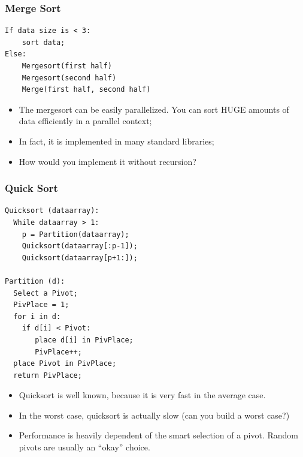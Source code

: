 \documentclass{beamer}
\begin{document}
\begin{frame}
  \frametitle{Merge Sort}
  \begin{block}{}
{\smaller
\begin{verbatim}
If data size is < 3:
    sort data;
Else:
    Mergesort(first half)
    Mergesort(second half)
    Merge(first half, second half)
\end{verbatim}
}
  \end{block}
  \begin{itemize}
  \item The mergesort can be easily parallelized. You can sort HUGE
    amounts of data efficiently in a parallel context;
  \item In fact, it is implemented in many standard libraries;
  \item How would you implement it without recursion?
  \end{itemize}
\end{frame}

\begin{frame}
  \frametitle{Quick Sort}
  
  \begin{block}{}
{\tiny
\begin{verbatim}
Quicksort (dataarray):
  While dataarray > 1:
    p = Partition(dataarray);
    Quicksort(dataarray[:p-1]);
    Quicksort(dataarray[p+1:]);

Partition (d):
  Select a Pivot;
  PivPlace = 1;
  for i in d:
    if d[i] < Pivot:
       place d[i] in PivPlace;
       PivPlace++;
  place Pivot in PivPlace;
  return PivPlace;
\end{verbatim}
}
\end{block}

  \begin{itemize}
  \item Quicksort is well known, because it is very fast in the average case.
  \item In the worst case, quicksort is actually slow (can you build a worst case?)
  \item Performance is heavily dependent of the smart selection of a
    pivot. Random pivots are usually an ``okay'' choice.
  \end{itemize}
\end{frame}
\end{document}
